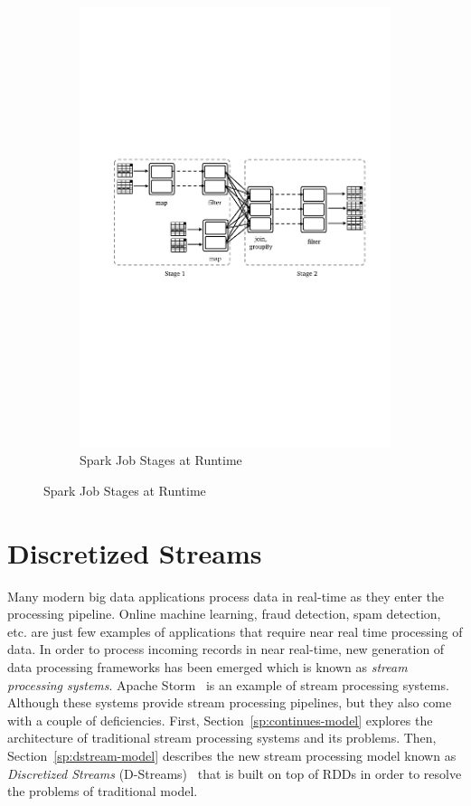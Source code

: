\begin{figure}[!htbp]
\begin{subfigure}[b]{\linewidth}
        \includegraphics[clip,trim=2.3cm 11.4cm 1.7cm 10cm,scale=0.8]{stage-dag.pdf}
        \caption{Spark Job Stages at Runtime}
        \label{fig:sp:dag}
    \end{subfigure}
\end{figure}

\section{Discretized Streams}
\label{sp:dstream}
Many modern big data applications process data in real-time as they enter the processing pipeline. Online machine learning, fraud detection, spam detection, etc. are just few examples of applications that require near real time processing of data. In order to process incoming records in near real-time, new generation of data processing frameworks has been emerged which is known as \emph{stream processing systems}. Apache Storm~\cite{Storm} is an example of stream processing systems. Although these systems provide stream processing pipelines, but they also come with a couple of deficiencies. First, Section~\ref{sp:continues-model} explores the architecture of traditional stream processing systems and its problems. Then, Section~\ref{sp:dstream-model} describes the new stream processing model known as \emph{Discretized Streams} (D-Streams)~\cite{Zaharia:2013} that is built on top of RDDs in order to resolve the problems of traditional model.

